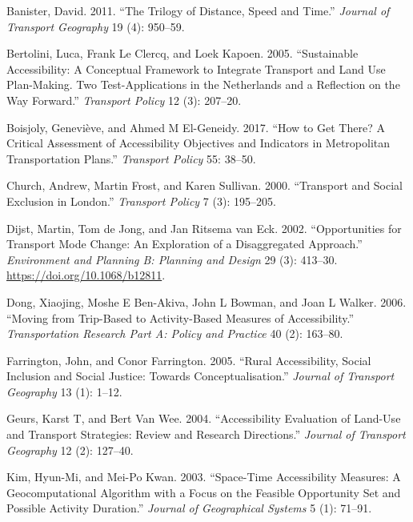 \documentclass[
  letterpaper,
  DIV=11,
  numbers=noendperiod]{scrreprt}
\newlength{\cslhangindent}
\newlength{\cslentryspacingunit} %
\newenvironment{CSLReferences}[2] %
 {%
  \setlength{\parindent}{0pt}
  \ifodd #1
  \let\oldpar\par
  \def\par{\hangindent=\cslhangindent\oldpar}
  \fi
  \setlength{\parskip}{#2\cslentryspacingunit}
 }%
 {}
\begin{document}
\hypertarget{refs}{}
\begin{CSLReferences}{1}{0}
\leavevmode{}%
Banister, David. 2011. {``The Trilogy of Distance, Speed and Time.''}
\emph{Journal of Transport Geography} 19 (4): 950--59.

\leavevmode{}%
Bertolini, Luca, Frank Le Clercq, and Loek Kapoen. 2005. {``Sustainable
Accessibility: A Conceptual Framework to Integrate Transport and Land
Use Plan-Making. Two Test-Applications in the Netherlands and a
Reflection on the Way Forward.''} \emph{Transport Policy} 12 (3):
207--20.

\leavevmode{}%
Boisjoly, Geneviève, and Ahmed M El-Geneidy. 2017. {``How to Get There?
A Critical Assessment of Accessibility Objectives and Indicators in
Metropolitan Transportation Plans.''} \emph{Transport Policy} 55:
38--50.

\leavevmode{}%
Church, Andrew, Martin Frost, and Karen Sullivan. 2000. {``Transport and
Social Exclusion in London.''} \emph{Transport Policy} 7 (3): 195--205.

\leavevmode{}%
Dijst, Martin, Tom de Jong, and Jan Ritsema van Eck. 2002.
{``Opportunities for Transport Mode Change: An Exploration of a
Disaggregated Approach.''} \emph{Environment and Planning B: Planning
and Design} 29 (3): 413--30. \url{https://doi.org/10.1068/b12811}.

\leavevmode{}%
Dong, Xiaojing, Moshe E Ben-Akiva, John L Bowman, and Joan L Walker.
2006. {``Moving from Trip-Based to Activity-Based Measures of
Accessibility.''} \emph{Transportation Research Part A: Policy and
Practice} 40 (2): 163--80.

\leavevmode{}%
Farrington, John, and Conor Farrington. 2005. {``Rural Accessibility,
Social Inclusion and Social Justice: Towards Conceptualisation.''}
\emph{Journal of Transport Geography} 13 (1): 1--12.

\leavevmode{}%
Geurs, Karst T, and Bert Van Wee. 2004. {``Accessibility Evaluation of
Land-Use and Transport Strategies: Review and Research Directions.''}
\emph{Journal of Transport Geography} 12 (2): 127--40.

\leavevmode{}%
Kim, Hyun-Mi, and Mei-Po Kwan. 2003. {``Space-Time Accessibility
Measures: A Geocomputational Algorithm with a Focus on the Feasible
Opportunity Set and Possible Activity Duration.''} \emph{Journal of
Geographical Systems} 5 (1): 71--91.


\end{CSLReferences}
\end{document}
